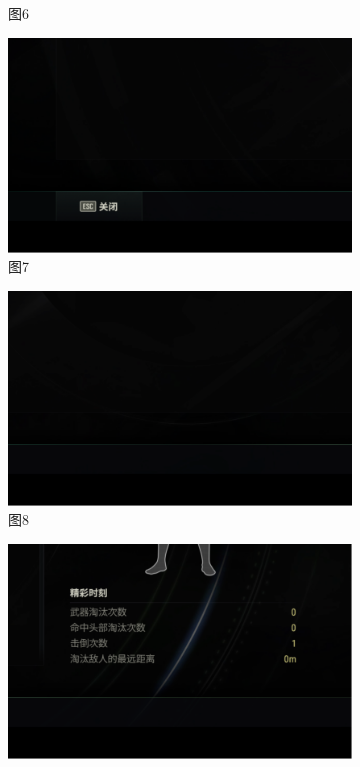 \documentclass[12pt, a4paper, oneside]{ctexart}
\begin{document}
\begin{figure}[htbp]
\begin{subfigure}{0.3\textwidth}
        \caption{图6}
    \end{subfigure}

    \medskip %

    \begin{subfigure}{0.3\textwidth}
        \centering
        \includegraphics[width=\textwidth]{fig/7.png} %
        \caption{图7}
    \end{subfigure}
    \hfill
    \begin{subfigure}{0.3\textwidth}
        \centering
        \includegraphics[width=\textwidth]{fig/8.png} %
        \caption{图8}
    \end{subfigure}
    \hfill
    \begin{subfigure}{0.3\textwidth}
        \centering
        \includegraphics[width=\textwidth]{fig/9.png} %

\end{subfigure}
\end{figure}
\end{document}
